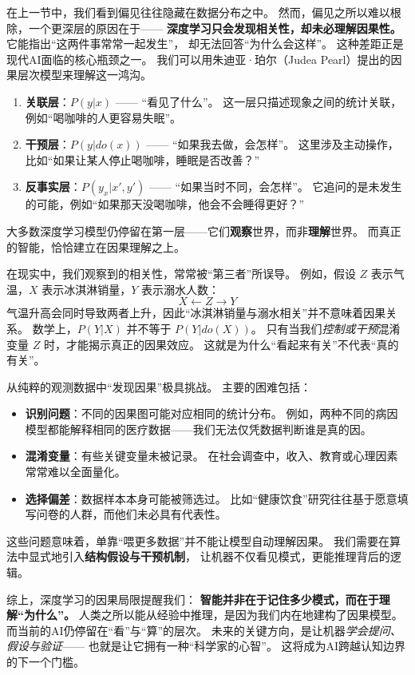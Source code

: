 在上一节中，我们看到偏见往往隐藏在数据分布之中。  
然而，偏见之所以难以根除，一个更深层的原因在于——  
\textbf{深度学习只会发现相关性，却未必理解因果性。}  
它能指出“这两件事常常一起发生”，  
却无法回答“为什么会这样”。  
这种差距正是现代AI面临的核心瓶颈之一。  
我们可以用朱迪亚·珀尔（Judea Pearl）提出的因果层次模型来理解这一鸿沟。

\begin{enumerate}
\item \textbf{关联层}：$P(y|x)$ —— “看见了什么”。  
    这一层只描述现象之间的统计关联，例如“喝咖啡的人更容易失眠”。  
\item \textbf{干预层}：$P(y|do(x))$ —— “如果我去做，会怎样”。  
    这里涉及主动操作，比如“如果让某人停止喝咖啡，睡眠是否改善？”  
\item \textbf{反事实层}：$P(y_x|x',y')$ —— “如果当时不同，会怎样”。  
    它追问的是未发生的可能，例如“如果那天没喝咖啡，他会不会睡得更好？”  
\end{enumerate}
大多数深度学习模型仍停留在第一层——它们\textbf{观察}世界，而非\textbf{理解}世界。  
而真正的智能，恰恰建立在因果理解之上。

在现实中，我们观察到的相关性，常常被“第三者”所误导。  
例如，假设 $Z$ 表示气温，$X$ 表示冰淇淋销量，$Y$ 表示溺水人数：  
$$X \leftarrow Z \rightarrow Y$$  
气温升高会同时导致两者上升，因此“冰淇淋销量与溺水相关”并不意味着因果关系。  
数学上，$P(Y|X)$ 并不等于 $P(Y|do(X))$。  
只有当我们\textit{控制或干预}混淆变量 $Z$ 时，才能揭示真正的因果效应。  
这就是为什么“看起来有关”不代表“真的有关”。

从纯粹的观测数据中“发现因果”极具挑战。  
主要的困难包括：  
\begin{itemize}
\item \textbf{识别问题}：不同的因果图可能对应相同的统计分布。  
  例如，两种不同的病因模型都能解释相同的医疗数据——我们无法仅凭数据判断谁是真的因。  
\item \textbf{混淆变量}：有些关键变量未被记录。  
  在社会调查中，收入、教育或心理因素常常难以全面量化。  
\item \textbf{选择偏差}：数据样本本身可能被筛选过。  
  比如“健康饮食”研究往往基于愿意填写问卷的人群，而他们未必具有代表性。  
\end{itemize}
这些问题意味着，单靠“喂更多数据”并不能让模型自动理解因果。  
我们需要在算法中显式地引入\textbf{结构假设与干预机制}，  
让机器不仅看见模式，更能推理背后的逻辑。

综上，深度学习的因果局限提醒我们：  
\textbf{智能并非在于记住多少模式，而在于理解“为什么”。}  
人类之所以能从经验中推理，是因为我们内在地建构了因果模型。  
而当前的AI仍停留在“看”与“算”的层次。  
未来的关键方向，是让机器\textit{学会提问、假设与验证}——  
也就是让它拥有一种“科学家的心智”。  
这将成为AI跨越认知边界的下一个门槛。

